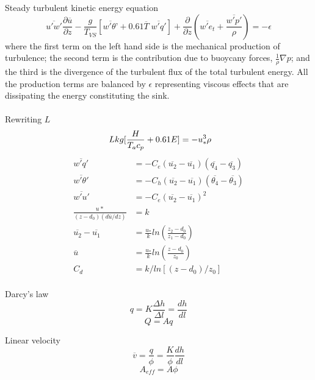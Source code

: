 \documentclass[12pt]{article}
\begin{document}
Steady turbulent kinetic energy equation
\begin{equation}
\overline{u'w'}\frac{\partial{\overline{u}}}{\partial{z}} -
 \frac{g}{T_{VS}} [\overline{w'\theta’}+
 0.61\overline{T}\phantom{.}\overline{w'q'}]+
 \frac{\partial{}}{\partial{z}} (\overline{w'e_{t}} + \frac{\overline{w'p'}}{\rho}) = -\epsilon
\end{equation}
where the first term on the left hand side is the mechanical production of turbulence; the second term is the contribution due to buoycany forces, $\frac{1}{\rho}\nabla p$; and the third is the divergence of the turbulent flux of the total turbulent energy. All the production terms are balanced by $\epsilon$ representing viscous effects that are dissipating the energy constituting the sink. \\
\\

Rewriting $L$\\
\begin{equation}
\ L{kg[ \frac{H}{T_{a}c_{p}} + 0.61E ]}={-u^{3}_{*}\rho}\\
\end{equation}
%
\begin{align*}
\overline{w'q'}&=-C_{e}(\overline{u_{2}}-\overline{u_{1}})(\overline{q_{4}}-\overline{q_{3}})\\
%
\overline{w'\theta'}&=-C_{h}(\overline{u_{2}}-\overline{u_{1}})(\overline{\theta_{4}}-\overline{\theta_{3}})\\
%
\overline{w'u'}&=-C_{e}(\overline{u_{2}}-\overline{u_{1}})^{2}\\
%
\frac{u_{}*}{(z-d_{0})(d\overline{u}/dz)}&=k\\
%
\overline{u_{2}}-\overline{u_{1}}&=\frac{u_{*}}{k}{ln}(\frac{z_{2}-d_{0}}{z_{1}-d_{0}})\\
%
\overline{u}&=\frac{u_{*}}{k}{ln}(\frac{z-d_{0}}{z_{0}})\\
%
C_{d}&={k/ln[(z-d_{0})/z_{0}]}\\
%
\end{align*}

Darcy’s law
\begin{equation} q=K \frac{\Delta h}{\Delta l} = \frac{dh}{dl} \end{equation}
\begin{equation}Q=Aq\end{equation}

Linear velocity
\begin{equation}\overline{v}=\frac{q}{\phi}=\frac{K}{\phi}\frac{dh}{dl}\end{equation}
\begin{equation}A_{eff}=A\phi\end{equation}
\end{document}
